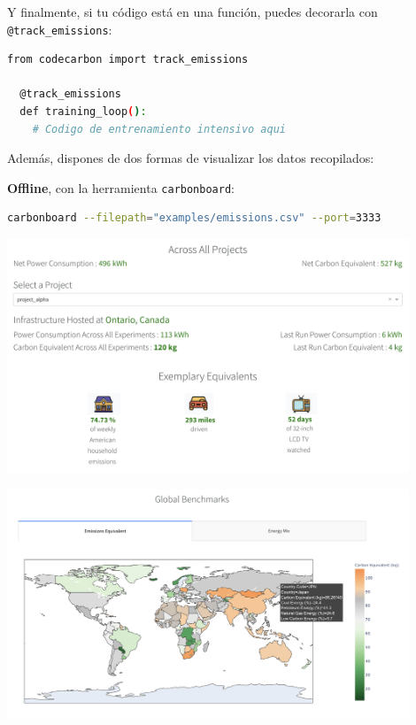 \documentclass[12pt,a4paper]{report}
\begin{document}
Y finalmente, si tu código está en una función, puedes decorarla con \texttt{@track\_emissions}:

\begin{tcolorbox}[colback=codebackground, colframe=codeborder, boxrule=0.8pt, arc=0mm, boxsep=5pt, left=5pt, right=5pt, top=5pt, bottom=5pt]
  \begin{lstlisting}[language=bash]
  from codecarbon import track_emissions

  @track_emissions
  def training_loop():
    # Codigo de entrenamiento intensivo aqui
  \end{lstlisting}
\end{tcolorbox}

Además, dispones de dos formas de visualizar los datos recopilados:

\textbf{Offline}, con la herramienta \texttt{carbonboard}:

\begin{tcolorbox}[colback=codebackground, colframe=codeborder, boxrule=0.8pt, arc=0mm, boxsep=5pt, left=5pt, right=5pt, top=5pt, bottom=5pt]
  \begin{lstlisting}[language=bash]
  carbonboard --filepath="examples/emissions.csv" --port=3333
  \end{lstlisting}
\end{tcolorbox}

\begin{center}
    \includegraphics[width=0.9\textwidth]{imagenes/CC_1.png}
\end{center}

\begin{center}
    \includegraphics[width=0.9\textwidth]{imagenes/CC_2.png}
\end{center}
\end{document}
